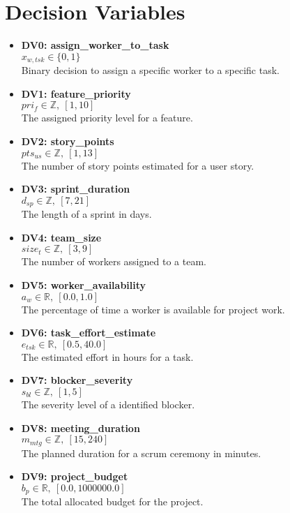 \documentclass[11pt]{article}
\begin{document}
\section{Decision Variables}
\begin{itemize}
    \item \textbf{DV0: assign\_worker\_to\_task} \\
          $x_{w, tsk} \in \{0, 1\}$ \\
          Binary decision to assign a specific worker to a specific task.

    \item \textbf{DV1: feature\_priority} \\
          $pri_f \in \mathbb{Z},\ [1, 10]$ \\
          The assigned priority level for a feature.

    \item \textbf{DV2: story\_points} \\
          $pts_{us} \in \mathbb{Z},\ [1, 13]$ \\
          The number of story points estimated for a user story.

    \item \textbf{DV3: sprint\_duration} \\
          $d_{sp} \in \mathbb{Z},\ [7, 21]$ \\
          The length of a sprint in days.

    \item \textbf{DV4: team\_size} \\
          $size_t \in \mathbb{Z},\ [3, 9]$ \\
          The number of workers assigned to a team.

    \item \textbf{DV5: worker\_availability} \\
          $a_w \in \mathbb{R},\ [0.0, 1.0]$ \\
          The percentage of time a worker is available for project work.

    \item \textbf{DV6: task\_effort\_estimate} \\
          $e_{tsk} \in \mathbb{R},\ [0.5, 40.0]$ \\
          The estimated effort in hours for a task.

    \item \textbf{DV7: blocker\_severity} \\
          $s_{bl} \in \mathbb{Z},\ [1, 5]$ \\
          The severity level of a identified blocker.

    \item \textbf{DV8: meeting\_duration} \\
          $m_{mtg} \in \mathbb{Z},\ [15, 240]$ \\
          The planned duration for a scrum ceremony in minutes.

    \item \textbf{DV9: project\_budget} \\
          $b_p \in \mathbb{R},\ [0.0, 1000000.0]$ \\
          The total allocated budget for the project.
\end{itemize}
\end{document}
